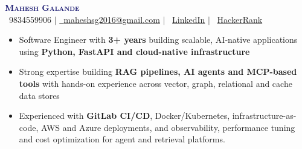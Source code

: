\documentclass[letterpaper,11pt]{article}
\begin{document}
\begin{center}
    \textbf{\Huge \scshape \textcolor{MidnightBlue}{Mahesh Galande}} \\ \vspace{2pt}
    \small \faPhone\ {9834559906} $|$ \href{mailto:maheshsg2016@gmail.com}{\textcolor{BrickRed}{\faEnvelope\ {maheshsg2016@gmail.com}}} $|$ 
    \textcolor{BrickRed}{\faLinkedin\ \href{https://www.linkedin.com/in/mahesh-galande-235b09241/}{{LinkedIn}}} $|$ 
    \textcolor{BrickRed}{\faCode\ \href{https://www.hackerrank.com/profile/maheshsg2016}{HackerRank}}
\end{center}


\vspace{-4pt}

\begin{itemize}[leftmargin=0.15in, label={\textbullet}, itemsep=1pt]
    \small
    \item Software Engineer with \textbf{3+ years} building scalable, AI-native applications using \textbf{Python, FastAPI and cloud-native infrastructure}
    \item Strong expertise building \textbf{RAG pipelines, AI agents and MCP-based tools} with hands-on experience across vector, graph, relational and cache data stores
    \item Experienced with \textbf{GitLab CI/CD}, Docker/Kubernetes, infrastructure-as-code, AWS and Azure deployments, and observability, performance tuning and cost optimization for agent and retrieval platforms.
\end{itemize}

\end{document}

